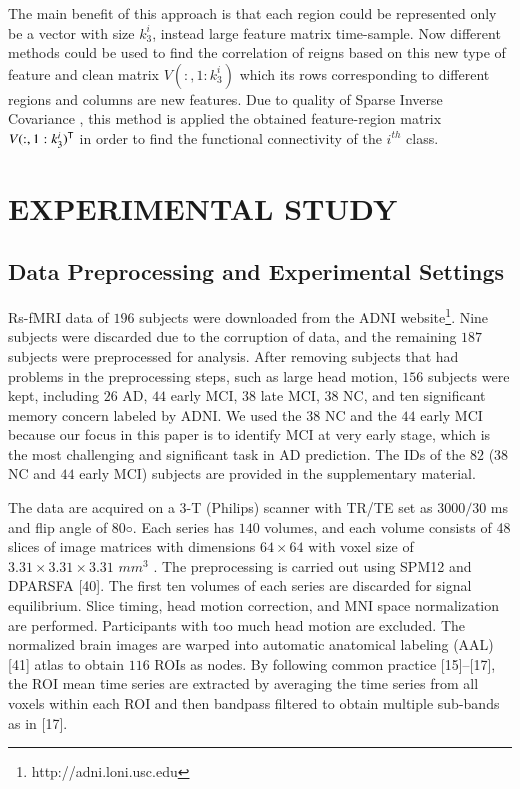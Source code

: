 \documentclass[preprint,12pt]{elsarticle}
\begin{document}
The main benefit of this approach is that each
region could be represented only be a vector with size $k_3^i$, instead large feature matrix  time-sample. Now different methods could be used to find the correlation of reigns based on this new type of feature and clean matrix $V(:,1:k_{3}^i)$ which its rows corresponding to different regions and columns are new features. Due to quality of  Sparse Inverse Covariance ,  this method is applied the obtained  feature-region matrix  $V(:,1:k_3^i)^{\sf T}$  in order to find the functional connectivity of the $i^{th}$ class.


\section{EXPERIMENTAL STUDY}
\subsection{Data Preprocessing and Experimental Settings}

Rs-fMRI data of $196$ subjects were downloaded from the ADNI website\footnote{http://adni.loni.usc.edu}. Nine subjects were discarded
due to the corruption of data, and the remaining $187$ subjects were preprocessed for analysis. After removing subjects that had problems in the preprocessing steps, such as large head motion,
$156$ subjects were kept, including $26$ AD, $44$ early MCI, $38$ late MCI, $38$ NC, and ten significant memory concern labeled by ADNI. We used the $38$ NC and the $44$ early MCI because our focus in this paper is to identify MCI at very early stage, which is the most challenging and significant task in AD
prediction. The IDs of the $82$ ($38$ NC and $44$ early MCI) subjects are provided in the supplementary material. 

The data are acquired on a $3$-T (Philips) scanner with TR/TE set as $3000/30$
ms and flip angle of $80◦$. Each series has $140$ volumes, and each volume consists of 48 slices of image matrices with dimensions
$64 \times 64$
with voxel size of
$ 3.31 \times  3.31 \times 3.31$
$mm^3$ . The preprocessing is carried out using SPM12 and DPARSFA [40]. The
first ten volumes of each series are discarded for signal equilibrium. Slice timing, head motion correction, and MNI space normalization are performed. Participants with too much head motion are excluded. The normalized brain images are warped into automatic anatomical labeling (AAL) [41] atlas to obtain $116$ ROIs as nodes. By following common practice [15]–[17], the ROI mean time series are extracted by averaging the time series from all voxels within each ROI and then bandpass filtered to obtain multiple sub-bands as in [17].
\end{document}
